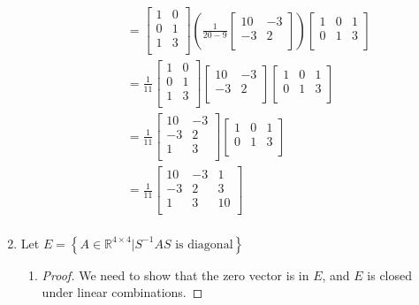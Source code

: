 \documentclass[12pt,letterpaper]{article}
\begin{document}
\begin{enumerate}
\begin{enumerate}
\begin{align*}
            &= \begin{bmatrix}1 & 0 \\ 0 & 1 \\ 1 & 3 \\\end{bmatrix} \left(\frac{1}{20 - 9}\begin{bmatrix}10 & -3 \\ -3 & 2 \\\end{bmatrix}\right) \begin{bmatrix}1 & 0 & 1 \\ 0 & 1 & 3 \\\end{bmatrix} \\
            &= \frac{1}{11} \begin{bmatrix}1 & 0 \\ 0 & 1 \\ 1 & 3 \\\end{bmatrix} \begin{bmatrix}10 & -3 \\ -3 & 2 \\\end{bmatrix} \begin{bmatrix}1 & 0 & 1 \\ 0 & 1 & 3 \\\end{bmatrix} \\
            &= \frac{1}{11} \begin{bmatrix}10 & -3 \\ -3 & 2 \\ 1 & 3 \\\end{bmatrix} \begin{bmatrix}1 & 0 & 1 \\ 0 & 1 & 3 \\\end{bmatrix} \\
            &= \frac{1}{11} \begin{bmatrix}10 & -3 & 1 \\ -3 & 2 & 3 \\ 1 & 3 & 10 \\\end{bmatrix} \\
          \end{align*}
      \end{enumerate}
    \item
      Let $E = \left\{A \in \mathbb{R}^{4 \times 4} | S^{-1}AS \text{ is diagonal} \right\}$
      \begin{enumerate}
        \item
          \begin{proof}
            We need to show that the zero vector is in $E$, and $E$ is closed under linear combinations.


\end{proof}
\end{enumerate}
\end{enumerate}
\end{document}
